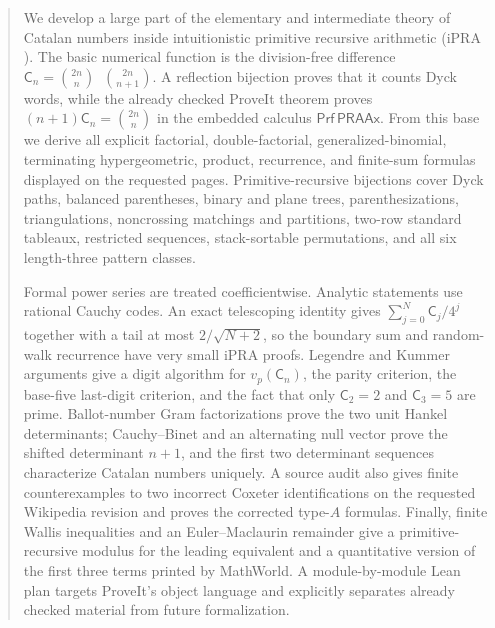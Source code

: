 \documentclass[11pt]{article}
\newcommand{\Cat}{\mathsf C}
\newcommand{\ipra}{\ensuremath{\mathrm{iPRA}}}
\newcommand{\monus}{\mathbin{\mathop{\dot{-}}}}
\theoremstyle{definition}
\theoremstyle{remark}
\numberwithin{equation}{section}
\begin{document}
\begin{abstract}
We develop a large part of the elementary and intermediate theory of Catalan
numbers inside intuitionistic primitive recursive arithmetic (\ipra).  The
basic numerical function is the division-free difference
\(\Cat_n=\binom{2n}{n}\monus\binom{2n}{n+1}\).  A reflection bijection proves
that it counts Dyck words, while the already checked ProveIt theorem proves
\((n+1)\Cat_n=\binom{2n}{n}\) in the embedded calculus
\(\mathsf{Prf}\,\mathsf{PRAAx}\).  From this base we derive all explicit
factorial, double-factorial, generalized-binomial, terminating
hypergeometric, product, recurrence, and finite-sum formulas displayed on the
requested pages.  Primitive-recursive bijections cover Dyck paths, balanced
parentheses, binary and plane trees, parenthesizations, triangulations,
noncrossing matchings and partitions, two-row standard tableaux, restricted
sequences, stack-sortable permutations, and all six length-three pattern
classes.

Formal power series are treated coefficientwise.  Analytic statements use
rational Cauchy codes.  An exact telescoping identity gives
\(\sum_{j=0}^N\Cat_j/4^j\) together with a tail at most
\(2/\sqrt{N+2}\), so the boundary sum and random-walk recurrence have very
small \ipra{} proofs.  Legendre and Kummer arguments give a digit algorithm for
\(v_p(\Cat_n)\), the parity criterion, the base-five last-digit criterion, and
the fact that only \(\Cat_2=2\) and \(\Cat_3=5\) are prime.  Ballot-number
Gram factorizations prove the two unit Hankel determinants; Cauchy--Binet and
an alternating null vector prove the shifted determinant \(n+1\), and the
first two determinant sequences characterize Catalan numbers uniquely.
A source audit also gives finite counterexamples to two incorrect Coxeter
identifications on the requested Wikipedia revision and proves the corrected
type-$A$ formulas.  Finally, finite Wallis inequalities and an
Euler--Maclaurin remainder give a primitive-recursive modulus for the leading equivalent and a quantitative
version of the first three terms printed by MathWorld.  A module-by-module
Lean plan targets ProveIt's object language and explicitly separates already
checked material from future formalization.
\end{abstract}

\tableofcontents
\newpage
{}












\end{document}
